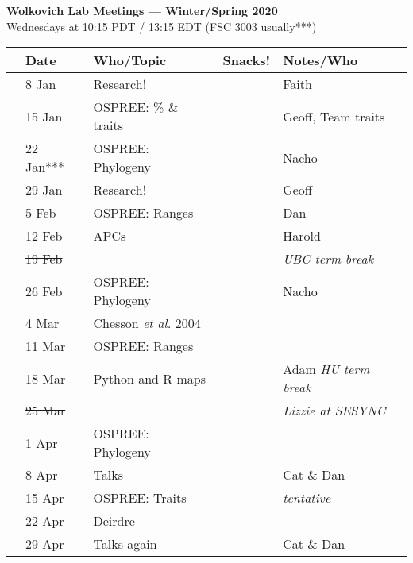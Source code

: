 \documentclass[11pt]{article}
\begin{document}
 
\raggedright
{}

\begin{center} 
{\large \textbf{Wolkovich Lab Meetings --- Winter/Spring 2020}} \\ [2pt]
Wednesdays at 10:15 PDT / 13:15 EDT (FSC 3003 usually***)\\
\end{center} 

\begin{center}
\begin{tabular}{ p{0.2 cm}  p{2 cm}  p{5 cm}  p{2 cm}  p{4 cm} }  \hline \hline
 & \textbf{Date}
   & \textbf{Who/Topic}
      & \textbf{Snacks!} 
         & \textbf{Notes/Who} \\ 
\hline \hline
 & 8 Jan & Research! &       & Faith  \\\hline
 & 15 Jan & OSPREE: \% \& traits   &  & Geoff, Team traits \\\hline
 & 22 Jan*** & OSPREE: Phylogeny &      & Nacho \\\hline  
 & 29 Jan & Research! &       &  Geoff\\\hline
 & 5 Feb & OSPREE: Ranges &  & Dan \\\hline
 & 12 Feb & APCs &    & Harold\\\hline
 & \sout{19 Feb} & &       & \emph{UBC term break}   \\\hline 
 & 26 Feb  & OSPREE: Phylogeny  &       & Nacho \\\hline
 & 4 Mar & Chesson \emph{et al.} 2004 &   &     \\\hline
 & 11 Mar & OSPREE: Ranges &       & \\\hline
 & 18 Mar & Python and R maps &       & Adam  \emph{HU term break} \\\hline
 & \sout{25 Mar} & &       &\emph{Lizzie at SESYNC}   \\\hline
 & 1 Apr & OSPREE: Phylogeny &   & \\\hline
 & 8 Apr & Talks &    &Cat \& Dan \\\hline
 & 15 Apr & OSPREE: Traits &    & \emph{tentative} \\\hline
 & 22 Apr & Deirdre &    & \\\hline
 & 29 Apr & Talks again &    & Cat \& Dan \\\hline

\hline
\end{tabular}
\end{center}
\end{document}
